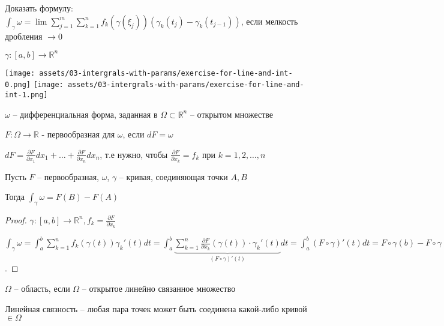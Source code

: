 \newpage

\begin{exerc}
    Доказать формулу: $\int_{\gamma}^{}\omega = \lim \sum_{j = 1}^{m} \sum_{k = 1}^{n} f_k (\gamma(\xi_j))(\gamma_k(t_j) - \gamma_k(t_{j - 1}))$, если мелкость дробления $\to 0$

    $\gamma: [a, b] \to \mathbb{R}^n$
    
    \begin{center}
        \texttt{[image: assets/03-intergrals-with-params/exercise-for-line-and-int-0.png]}
        \texttt{[image: assets/03-intergrals-with-params/exercise-for-line-and-int-1.png]}
    \end{center}
\end{exerc}

\begin{definition}
    $\omega$ -- дифференциальная форма, заданная в $\Omega \subset \mathbb{R}^n$ -- открытом множестве

    $F: \Omega \to \mathbb{R}$ - первообразная для $\omega$, если $dF = \omega$

    $dF = \frac{\partial F}{\partial x_1}dx_1 + \dots + \frac{\partial F}{\partial x_n}dx_n$, т.е нужно, чтобы $\frac{\partial F}{\partial x_k} = f_k$ при $k = 1, 2, \dots, n$
\end{definition}

\begin{theorem}
    Пусть $F$ -- первообразная, $\omega$, $\gamma$ -- кривая, соединяющая точки $A, B$

    Тогда $\int_{\gamma}^{}\omega = F(B) - F(A)$
\end{theorem}

\begin{proof}
    $\gamma: [a, b] \to \mathbb{R}^n, f_k = \frac{\partial F}{\partial x_k}$

    $\int_{\gamma}^{}\omega = \int_{a}^{b}\sum_{k = 1}^{n}f_k(\gamma(t))\gamma_k'(t) dt = \int_{a}^{b}\underbrace{\sum_{k = 1}^{n} \frac{\partial F}{\partial x_k}(\gamma(t)) \cdot \gamma_k'(t)}_{(F \circ \gamma)'(t)} dt = \int_{a}^{b}(F \circ \gamma)'(t) dt = F \circ \gamma(b) - F \circ \gamma(a) = F(\gamma(b)) - F(\gamma(a)) = F(B) - F(A)$.
\end{proof}

\begin{definition}
    $\Omega$ -- область, если $\Omega$ -- открытое линейно связанное множество

    Линейная связность -- любая пара точек может быть соединена какой-либо кривой $\in \Omega$
\end{definition}

